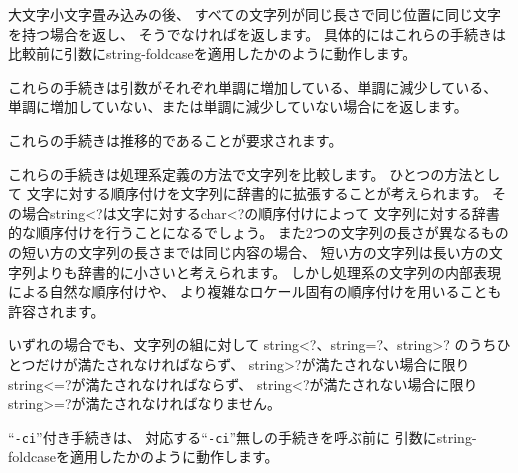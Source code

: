 \begin{entry}{%
}

大文字小文字畳み込みの後、
すべての文字列が同じ長さで同じ位置に同じ文字を持つ場合\schtrue{}を返し、
そうでなければ\schfalse{}を返します。
具体的にはこれらの手続きは比較前に引数に{\cf string-foldcase}を適用したかのように動作します。

\end{entry}


\begin{entry}{%
}

これらの手続きは引数がそれぞれ単調に増加している、単調に減少している、
単調に増加していない、または単調に減少していない場合に\schtrue{}を返します。

これらの手続きは推移的であることが要求されます。

これらの手続きは処理系定義の方法で文字列を比較します。
ひとつの方法として
文字に対する順序付けを文字列に辞書的に拡張することが考えられます。
その場合{\cf string<?}は文字に対する{\cf char<?}の順序付けによって
文字列に対する辞書的な順序付けを行うことになるでしょう。
また2つの文字列の長さが異なるものの短い方の文字列の長さまでは同じ内容の場合、
短い方の文字列は長い方の文字列よりも辞書的に小さいと考えられます。
しかし処理系の文字列の内部表現による自然な順序付けや、
より複雑なロケール固有の順序付けを用いることも許容されます。

いずれの場合でも、文字列の組に対して
{\cf string<?}、{\cf string=?}、{\cf string>?}
のうちひとつだけが満たされなければならず、
{\cf string>?}が満たされない場合に限り{\cf string<=?}が満たされなければならず、
{\cf string<?}が満たされない場合に限り{\cf string>=?}が満たされなければなりません。

``{\tt -ci}''付き手続きは、
対応する``{\tt -ci}''無しの手続きを呼ぶ前に
引数に{\cf string-foldcase}を適用したかのように動作します。


\end{entry}

